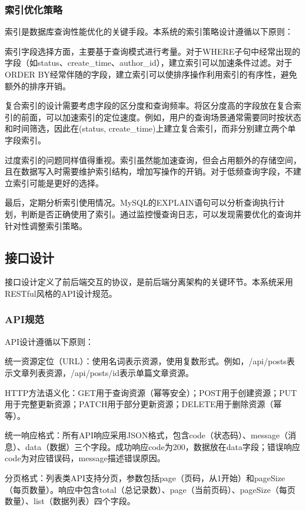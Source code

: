 \documentclass[UTF8,AutoFakeBold=1,AutoFakeSlant,zihao=-4]{SCAU}
\begin{document}
\subsubsection{索引优化策略}

索引是数据库查询性能优化的关键手段。本系统的索引策略设计遵循以下原则：

索引字段选择方面，主要基于查询模式进行考量。对于WHERE子句中经常出现的字段（如status、create\_time、author\_id），建立索引可以加速条件过滤。对于ORDER BY经常伴随的字段，建立索引可以使排序操作利用索引的有序性，避免额外的排序开销。

复合索引的设计需要考虑字段的区分度和查询频率。将区分度高的字段放在复合索引的前面，可以加速索引的定位速度。例如，用户的查询场景通常需要同时按状态和时间筛选，因此在(status, create\_time)上建立复合索引，而非分别建立两个单字段索引。

过度索引的问题同样值得重视。索引虽然能加速查询，但会占用额外的存储空间，且在数据写入时需要维护索引结构，增加写操作的开销。对于低频查询字段，不建立索引可能是更好的选择。

 最后，定期分析索引使用情况。MySQL的EXPLAIN语句可以分析查询执行计划，判断是否正确使用了索引。通过监控慢查询日志，可以发现需要优化的查询并针对性调整索引策略。

 \subsection{接口设计}

 接口设计定义了前后端交互的协议，是前后端分离架构的关键环节。本系统采用RESTful风格的API设计规范。

 \subsubsection{API规范}

 API设计遵循以下原则：

 统一资源定位（URL）：使用名词表示资源，使用复数形式。例如，/api/posts表示文章列表资源，/api/posts/{id}表示单篇文章资源。

 HTTP方法语义化：GET用于查询资源（幂等安全）；POST用于创建资源；PUT用于完整更新资源；PATCH用于部分更新资源；DELETE用于删除资源（幂等）。

 统一响应格式：所有API响应采用JSON格式，包含code（状态码）、message（消息）、data（数据）三个字段。成功响应code为200，数据放在data字段；错误响应code为对应错误码，message描述错误原因。

 分页格式：列表类API支持分页，参数包括page（页码，从1开始）和pageSize（每页数量）。响应中包含total（总记录数）、page（当前页码）、pageSize（每页数量）、list（数据列表）四个字段。
\end{document}
